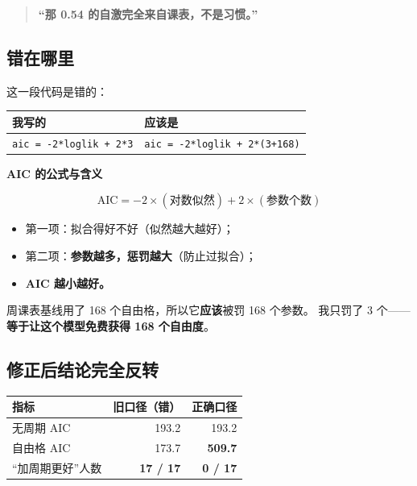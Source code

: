 \documentclass[UTF8,a4paper,11pt]{ctexart}
\newenvironment{explainbox}[1]
{\begin{center}\begin{minipage}{0.94\textwidth}\colorbox{boxbg}{\parbox{0.92\textwidth}{\textbf{#1}\par\vspace{2pt}}}}
{\end{minipage}\end{center}}
\begin{document}
\begin{quote}
\textbf{“那 0.54 的自激完全来自课表，不是习惯。”}
\end{quote}

\subsection{错在哪里}

这一段代码是错的：

\begin{center}
\begin{tabular}{p{7.6cm}p{5.2cm}}
\toprule
\textbf{我写的} & \textbf{应该是} \\
\midrule
\texttt{aic = -2*loglik + 2*3} & \texttt{aic = -2*loglik + 2*(3+168)} \\
\bottomrule
\end{tabular}
\end{center}

\begin{explainbox}{AIC 的公式与含义}
\begin{equation}
\text{AIC} = -2 \times (\text{对数似然}) + 2 \times (\text{参数个数})
\end{equation}
\begin{itemize}[leftmargin=1.4em,itemsep=1pt]
\item 第一项：拟合得好不好（似然越大越好）；
\item 第二项：\textbf{参数越多，惩罚越大}（防止过拟合）；
\item \textbf{AIC 越小越好。}
\end{itemize}
周课表基线用了 168 个自由格，所以它\textbf{应该}被罚 168 个参数。
我只罚了 3 个——\textbf{等于让这个模型免费获得 168 个自由度}。
\end{explainbox}

\subsection{修正后结论完全反转}

\begin{center}
\begin{tabular}{p{4.6cm}rr}
\toprule
\textbf{指标} & \textbf{旧口径（错）} & \textbf{正确口径} \\
\midrule
无周期 AIC & 193.2 & 193.2 \\
自由格 AIC & 173.7 & \textbf{509.7} \\
“加周期更好”人数 & \textbf{17 / 17} & \textbf{0 / 17} \\
\bottomrule
\end{tabular}
\end{center}
\end{document}
